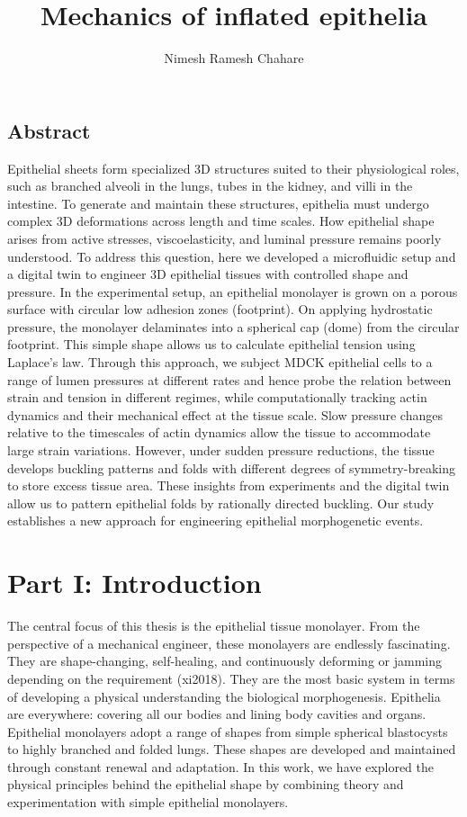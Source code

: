 \documentclass[
]{article}
\title{Mechanics of inflated epithelia}
\author{Nimesh Ramesh Chahare}
\date{}
\begin{document}
\maketitle

\hypertarget{abstract}{%
\subsection{Abstract}\label{abstract}}

Epithelial sheets form specialized 3D structures suited to their
physiological roles, such as branched alveoli in the lungs, tubes in the
kidney, and villi in the intestine. To generate and maintain these
structures, epithelia must undergo complex 3D deformations across length
and time scales. How epithelial shape arises from active stresses,
viscoelasticity, and luminal pressure remains poorly understood. To
address this question, here we developed a microfluidic setup and a
digital twin to engineer 3D epithelial tissues with controlled shape and
pressure. In the experimental setup, an epithelial monolayer is grown on
a porous surface with circular low adhesion zones (footprint). On
applying hydrostatic pressure, the monolayer delaminates into a
spherical cap (dome) from the circular footprint. This simple shape
allows us to calculate epithelial tension using Laplace's law. Through
this approach, we subject MDCK epithelial cells to a range of lumen
pressures at different rates and hence probe the relation between strain
and tension in different regimes, while computationally tracking actin
dynamics and their mechanical effect at the tissue scale. Slow pressure
changes relative to the timescales of actin dynamics allow the tissue to
accommodate large strain variations. However, under sudden pressure
reductions, the tissue develops buckling patterns and folds with
different degrees of symmetry-breaking to store excess tissue area.
These insights from experiments and the digital twin allow us to pattern
epithelial folds by rationally directed buckling. Our study establishes
a new approach for engineering epithelial morphogenetic events.

\hypertarget{part-i-introduction-1}{%
\section{Part I: Introduction}\label{part-i-introduction-1}}

The central focus of this thesis is the epithelial tissue monolayer.
From the perspective of a mechanical engineer, these monolayers are
endlessly fascinating. They are shape-changing, self-healing, and
continuously deforming or jamming depending on the requirement (xi2018).
They are the most basic system in terms of developing a physical
understanding the biological morphogenesis. Epithelia are everywhere:
covering all our bodies and lining body cavities and organs. Epithelial
monolayers adopt a range of shapes from simple spherical blastocysts to
highly branched and folded lungs. These shapes are developed and
maintained through constant renewal and adaptation. In this work, we
have explored the physical principles behind the epithelial shape by
combining theory and experimentation with simple epithelial monolayers.
\end{document}
